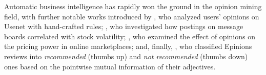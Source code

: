 Automatic business intelligence has rapidly won the ground in the
opinion mining field, with further notable works introduced by
\citet{Glance:05}, who analyzed users' opinions on Usenet with
hand-crafted rules; \citet{Antweiler:04}, who investigated how
postings on message boards correlated with stock volatility;
\citet{Ghose:07}, who examined the effect of opinions on the pricing
power in online marketplaces; and, finally, \citet{Turney:02}, who
classified Epinions reviews into \emph{recommended} (thumbs up) and
\emph{not recommended} (thumbs down) ones based on the pointwise
mutual information of their adjectives.



